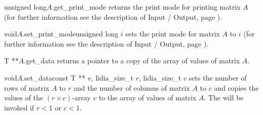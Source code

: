 \label{base_matrix_access}

\begin{cfcode}{unsigned long}{$A$.get_print_mode}{}
  returns the print mode for printing matrix $A$ (for further information see the description of
  Input / Output, page \pageref{base_matrix_io}).
\end{cfcode}

\begin{fcode}{void}{$A$.set_print_mode}{unsigned long $i$}
  sets the print mode for matrix $A$ to $i$ (for further information see the description of
  Input / Output, page \pageref{base_matrix_io}).
\end{fcode}









\begin{cfcode}{T **}{$A$.get_data}{}
  returns a pointer to a copy of the array of values of matrix $A$.
\end{cfcode}

\begin{fcode}{void}{$A$.set_data}{const T ** $v$, lidia_size_t $r$, lidia_size_t $c$}
  sets the number of rows of matrix $A$ to $r$ and the number of columns of matrix $A$ to $c$
  and copies the values of the $(r \times c)$-array $v$ to the array of values of matrix $A$.
  The \LEH will be invoked if $r < 1$ or $c < 1$.
\end{fcode}


